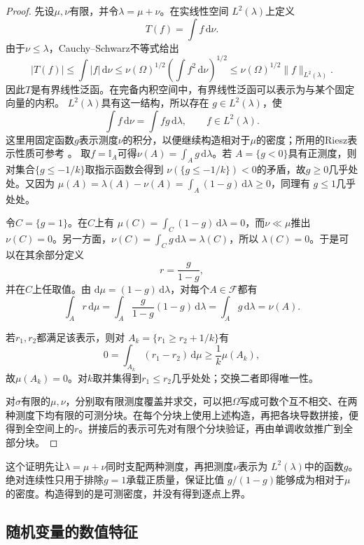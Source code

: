 \begin{proof}
先设\(\mu,\nu\)有限，并令\(\lambda=\mu+\nu\)。在实线性空间
\(L^2(\lambda)\)上定义
\[
  T(f)=\int f\,\mathrm{d}\nu.
\]
由于\(\nu\leq\lambda\)，Cauchy--Schwarz不等式给出
\[
  |T(f)|
  \leq\int|f|\,\mathrm{d}\nu
  \leq\nu(\Omega)^{1/2}
       \left(\int f^2\,\mathrm{d}\nu\right)^{1/2}
  \leq\nu(\Omega)^{1/2}\lVert f\rVert_{L^2(\lambda)}.
\]
因此\(T\)是有界线性泛函。在完备内积空间中，有界线性泛函可以表示为与某个固定向量的内积。
\(L^2(\lambda)\)具有这一结构，所以存在
\(g\in L^2(\lambda)\)，使
\[
  \int f\,\mathrm{d}\nu=\int fg\,\mathrm{d}\lambda,
  \qquad f\in L^2(\lambda).
\]
这里用固定函数\(g\)表示测度\(\nu\)的积分，以便继续构造相对于\(\mu\)的密度；所用的Riesz表示性质可参考
。
取\(f=\mathbb{I}_A\)可得\(\nu(A)=\int_Ag\,\mathrm{d}\lambda\)。若
\(A=\{g<0\}\)具有正测度，则对集合\(\{g\leq-1/k\}\)取指示函数会得到
\(\nu(\{g\leq-1/k\})<0\)的矛盾，故\(g\geq0\)几乎处处。又因为
\(\mu(A)=\lambda(A)-\nu(A)=\int_A(1-g)\,\mathrm{d}\lambda\geq0\)，同理有
\(g\leq1\)几乎处处。

令\(C=\{g=1\}\)。在\(C\)上有
\(\mu(C)=\int_C(1-g)\,\mathrm{d}\lambda=0\)，而\(\nu\ll\mu\)推出
\(\nu(C)=0\)。另一方面，\(\nu(C)=\int_Cg\,\mathrm{d}\lambda=\lambda(C)\)，所以
\(\lambda(C)=0\)。于是可以在其余部分定义
\[
  r=\frac{g}{1-g},
\]
并在\(C\)上任取值。由
\(\mathrm{d}\mu=(1-g)\,\mathrm{d}\lambda\)，对每个\(A\in\mathcal{F}\)都有
\[
  \int_A r\,\mathrm{d}\mu
  =\int_A\frac{g}{1-g}(1-g)\,\mathrm{d}\lambda
  =\int_Ag\,\mathrm{d}\lambda
  =\nu(A).
\]

若\(r_1,r_2\)都满足该表示，则对
\(A_k=\{r_1\geq r_2+1/k\}\)有
\[
  0=\int_{A_k}(r_1-r_2)\,\mathrm{d}\mu
  \geq\frac{1}{k}\mu(A_k),
\]
故\(\mu(A_k)=0\)。对\(k\)取并集得到\(r_1\leq r_2\)几乎处处；交换二者即得唯一性。

对\(\sigma\)有限的\(\mu,\nu\)，分别取有限测度覆盖并求交，可以把\(\Omega\)写成可数个互不相交、在两种测度下均有限的可测分块。在每个分块上使用上述构造，再把各块导数拼接，便得到全空间上的\(r\)。拼接后的表示可先对有限个分块验证，再由单调收敛推广到全部分块。
\end{proof}

这个证明先让\(\lambda=\mu+\nu\)同时支配两种测度，再把测度\(\nu\)表示为
\(L^2(\lambda)\)中的函数\(g\)。绝对连续性只用于排除\(g=1\)承载正质量，保证比值
\(g/(1-g)\)能够成为相对于\(\mu\)的密度。构造得到的是可测密度，并没有得到逐点上界。

\subsection{随机变量的数值特征}
\label{sec:rv-features}


